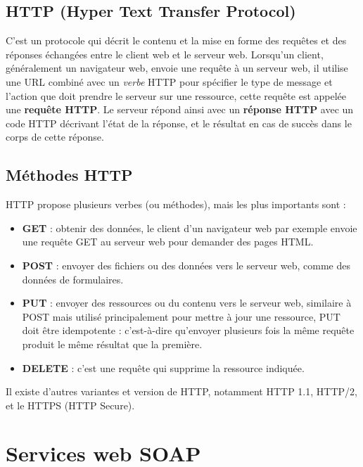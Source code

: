 \subsection{HTTP (Hyper Text Transfer Protocol)}
C'est un protocole qui décrit le contenu et la mise en forme des requêtes et des réponses échangées entre le client web et le serveur web. 
Lorsqu'un client, généralement un navigateur web, envoie une requête à un serveur web, il utilise une URL combiné avec un \emph{verbe} HTTP pour spécifier le type de message et l'action que doit prendre le serveur sur une ressource, cette requête est appelée une \textbf{requête HTTP}. Le serveur répond ainsi avec un \textbf{réponse HTTP} avec un code HTTP décrivant l'état de la réponse, et le résultat en cas de succès dans le corps de cette réponse.

\subsection{Méthodes HTTP}
HTTP propose plusieurs verbes (ou méthodes), mais les plus importants sont : 
\begin{itemize}
	\item \textbf{GET} : obtenir des données, le client d'un navigateur web par exemple envoie une requête GET au serveur web pour demander des pages HTML.
	\item \textbf{POST} : envoyer des fichiers ou des données vers le serveur web, comme des données de formulaires.
	\item \textbf{PUT} : envoyer des ressources ou du contenu vers le serveur web, similaire à POST mais utilisé principalement pour mettre à jour une ressource, PUT doit être idempotente : c'est-à-dire qu'envoyer plusieurs fois la même requête produit le même résultat que la première.
	\item \textbf{DELETE} : c'est une requête  qui supprime la ressource indiquée.
\end{itemize}

Il existe d'autres variantes et version de HTTP, notamment HTTP 1.1, HTTP/2, et le HTTPS (HTTP Secure).


\section{Services web SOAP} 
\label{section:Soap}
